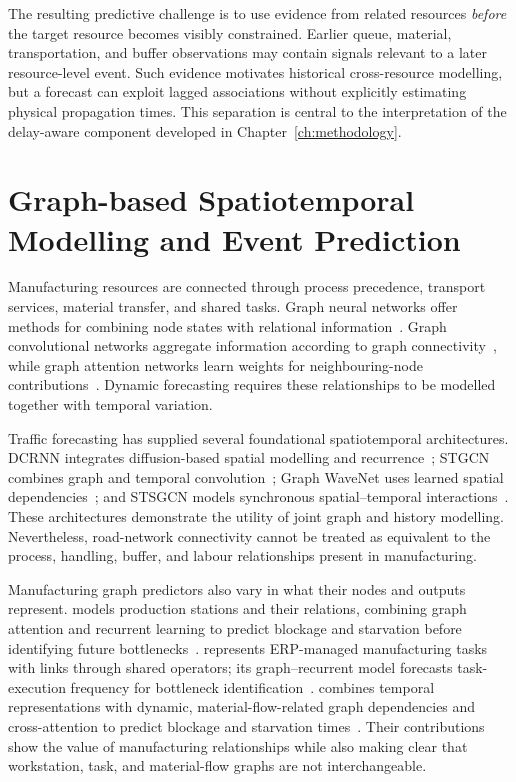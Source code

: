 The resulting predictive challenge is to use evidence from related resources \emph{before} the target resource becomes visibly constrained. Earlier queue, material, transportation, and buffer observations may contain signals relevant to a later resource-level event. Such evidence motivates historical cross-resource modelling, but a forecast can exploit lagged associations without explicitly estimating physical propagation times. This separation is central to the interpretation of the delay-aware component developed in Chapter~\ref{ch:methodology}.

\section{Graph-based Spatiotemporal Modelling and Event Prediction}\label{graph-based-spatiotemporal-modelling-and-event-prediction}

Manufacturing resources are connected through process precedence, transport services, material transfer, and shared tasks. Graph neural networks offer methods for combining node states with relational information~\cite{wu2021gnn}. Graph convolutional networks aggregate information according to graph connectivity~\cite{kipf2017gcn}, while graph attention networks learn weights for neighbouring-node contributions~\cite{velickovic2018gat}. Dynamic forecasting requires these relationships to be modelled together with temporal variation.

Traffic forecasting has supplied several foundational spatiotemporal architectures. DCRNN integrates diffusion-based spatial modelling and recurrence~\cite{li2018dcrnn}; STGCN combines graph and temporal convolution~\cite{yu2018stgcn}; Graph WaveNet uses learned spatial dependencies~\cite{wu2019graphwavenet}; and STSGCN models synchronous spatial--temporal interactions~\cite{song2020stsgcn}. These architectures demonstrate the utility of joint graph and history modelling. Nevertheless, road-network connectivity cannot be treated as equivalent to the process, handling, buffer, and labour relationships present in manufacturing.

Manufacturing graph predictors also vary in what their nodes and outputs represent.  models production stations and their relations, combining graph attention and recurrent learning to predict blockage and starvation before identifying future bottlenecks~\cite{lai2023bstan}.  represents ERP-managed manufacturing tasks with links through shared operators; its graph--recurrent model forecasts task-execution frequency for bottleneck identification~\cite{yin2025btgcn}.  combines temporal representations with dynamic, material-flow-related graph dependencies and cross-attention to predict blockage and starvation times~\cite{cen2025dstnn}. Their contributions show the value of manufacturing relationships while also making clear that workstation, task, and material-flow graphs are not interchangeable.

